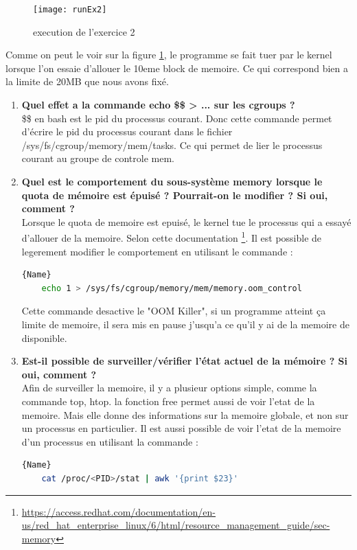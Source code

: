 \documentclass[
	a4paper, %
	10pt, %
]{CSUniSchoolLabReport}
\begin{document}
\begin{figure}[H]
	\centering
	\texttt{[image: runEx2]}
	\caption{execution de l'exercice 2}
	\label{fig:ex2}
\end{figure}

Comme on peut le voir sur la figure \ref{fig:ex2}, le programme se fait tuer par le kernel lorsque l'on essaie d'allouer le 10eme block de memoire.
Ce qui correspond bien a la limite de 20MB que nous avons fixé.

\begin{enumerate}[label=\textbf{\arabic*}]
	\item \textbf{Quel effet a la commande echo \$\$ > ... sur les cgroups ?}\\
\$\$ en bash est le pid du processus courant. Donc cette commande permet d'écrire le pid du processus courant dans le fichier /sys/fs/cgroup/memory/mem/tasks. Ce qui permet de lier le processus courant au groupe de controle mem.
	
	\item \textbf{Quel est le comportement du sous-système memory lorsque le quota de mémoire est épuisé ? Pourrait-on le modifier ? Si oui, comment ?}\\
Lorsque le quota de memoire est epuisé, le kernel tue le processus qui a essayé d'allouer de la memoire.
Selon cette documentation \footnote{\href{https://access.redhat.com/documentation/en-us/red_hat_enterprise_linux/6/html/resource_management_guide/sec-memory}{https://access.redhat.com/documentation/en-us/red\_hat\_enterprise\_linux/6/html/resource\_management\_guide/sec-memory}}.
Il est possible de legerement modifier le comportement en utilisant le commande :
\begin{lstlisting}[language=bash]{Name}
	echo 1 > /sys/fs/cgroup/memory/mem/memory.oom_control
\end{lstlisting}
Cette commande desactive le "OOM Killer", si un programme atteint ça limite de memoire, il sera mis en pause j'usqu'a ce qu'il y ai de la memoire de disponible.

	\item \textbf{Est-il possible de surveiller/vérifier l’état actuel de la mémoire ? Si oui, comment ?}\\
Afin de surveiller la memoire, il y a plusieur options simple, comme la commande top, htop.
la fonction free permet aussi de voir l'etat de la memoire. Mais elle donne des informations sur la memoire globale, et non sur un processus en particulier.
Il est aussi possible de voir l'etat de la memoire d'un processus en utilisant la commande :
\begin{lstlisting}[language=bash]{Name}
	cat /proc/<PID>/stat | awk '{print $23}'
\end{lstlisting}
\end{enumerate}
\end{document}
